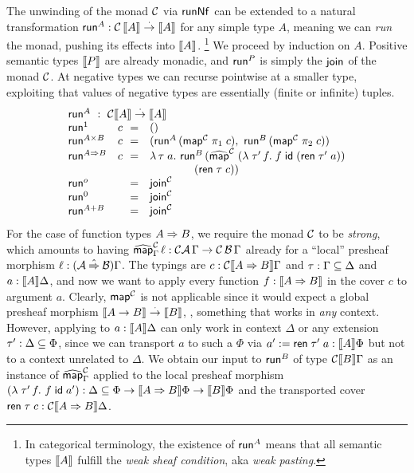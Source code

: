 \documentclass[sigplan,screen,fleqn]{acmart}
\begin{document}
The unwinding of the monad $\C$ via $\trunNf$ can be extended to a
natural transformation $\trun^A : \C\,\den A \todot \den A$ for any simple
type $A$, meaning we can \emph{run} the monad,
pushing its effects into $\den A$.%
\footnote{In categorical terminology, the existence of
$\trun^A$ means that
all semantic types $\den{A}$ fulfill the \emph{weak sheaf condition},
aka \emph{weak pasting}.}
We proceed by induction on $A$.
Positive semantic types $\den P$ are already monadic,
and $\trun^P$ is simply the $\tjoin$ of the monad $\C$.
At negative types we can recurse pointwise at a smaller type,
exploiting that values of negative types are essentially
(finite or infinite) tuples.
\[
\begin{array}{ll@{~~}cl}%
  \multicolumn 4 l {\trun^A ~:~ \C \den A \todot \den A} \\
  \trun^{\tyone} & c & = & \ttempty
    \\
  \trun^{A \times B} & c & = &
      (\trun^A\,(\tmap[\C]\;\pi_1\;c),\
       \trun^B\,(\tmap[\C]\;\pi_2\;c))
  \\
  \trun^{A \To B} & c  & = & \lambda \,\tau \; a. \ \trun^B\,
      (\stmap[\C]\;(\lambda\;\tau'\,f.\;f\;\tid\;(\tren\;\tau'\;a))
  \\ &&& \qquad \qquad (\tren\;\tau\;c))
  \\
  \trun^{o}      & & = & \tjoin[\C]
  \\
  \trun^{\tyzero} & & = & \tjoin[\C]
  \\
  \trun^{A + B}   & & = & \tjoin[\C]
  \\
\end{array}
\]
For the case of function types $A \To B$, we require the monad $\C$ to be
\emph{strong}, which amounts to having
$\stmap[\C]_\Gamma\, \ell : \C\A\,\Gamma \to \C\,\B\,\Gamma$ already for
a ``local'' presheaf morphism $\ell : (\A \hatto \B)\Gamma$.
The typings are
$c : \C \den{A \To B} \Gamma$ and
$\tau : \Gamma \sublist \Delta$ and
$a : \den A \Delta$, and now we want to apply every function
$f : \den{A \To B}$ in the cover $c$ to argument $a$.  Clearly,
$\tmap[\C]$ is not applicable since it would expect a
global presheaf morphism
$\den{A \to B} \todot \den B$, \ie, something that works in \emph{any}
context.  However, applying to $a : \den A \Delta$ can only work in
context $\Delta$ or any extension $\tau' : \Delta \sublist \Phi$,
since we can transport $a$ to such a $\Phi$ via
$a' := \tren\; \tau'\; a : \den A \Phi$ but not to a context unrelated to
$\Delta$.  We obtain our input to $\trun^B$ of type $\C \den B \Gamma$
as an instance of $\stmap[\C]_\Gamma$ applied to the local presheaf morphism
$(\lambda \; \tau'\, f. \  f\;\tid\;a') :
\Delta \sublist \Phi \to  \den{A \To B}\Phi \to \den B \Phi$
and the transported cover $\tren\;\tau\;c : \C\den{A \To B}\Delta$.
\end{document}
